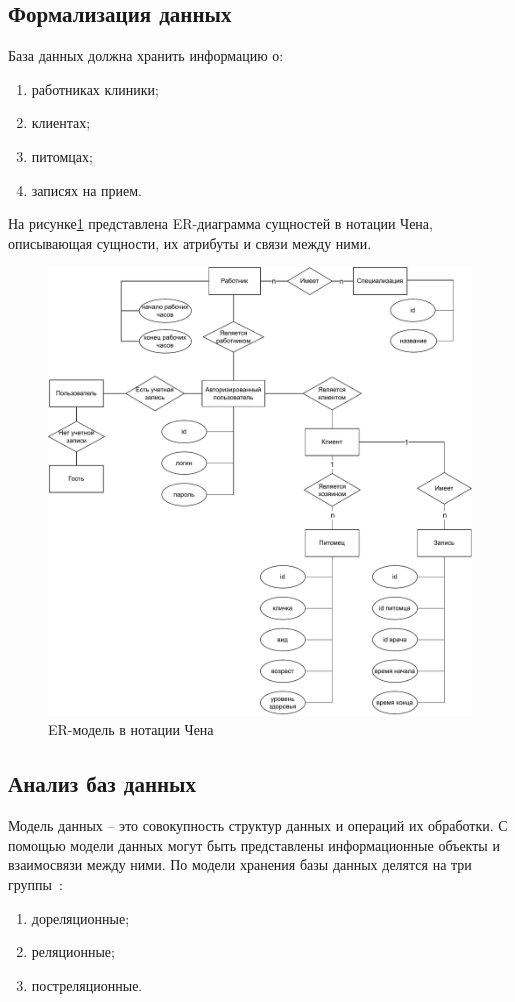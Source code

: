 \subsection{Формализация данных}

База данных должна хранить информацию о:
\begin{enumerate}[label*=---]
	\item работниках клиники;
	\item клиентах;
	\item питомцах;
	\item записях на прием.
\end{enumerate}

На рисунке\ref{img:er} представлена ER-диаграмма сущностей в нотации Чена, описывающая сущности, их атрибуты и связи между ними.

\begin{figure}[!h!]
	\centering
	\includegraphics[width=170mm]{image/er.pdf}
	\caption{ER-модель в нотации Чена}
	\label{img:er}
\end{figure}
\newpage

\subsection{Анализ баз данных}
Модель данных -- это совокупность структур данных и операций их обработки. С помощью модели данных могут быть представлены информационные объекты и взаимосвязи между ними. По модели хранения базы данных делятся на три группы~\cite{Date}: 
\begin{enumerate}[label*=---]
	\item дореляционные;
	\item реляционные;
	\item постреляционные.
\end{enumerate}

